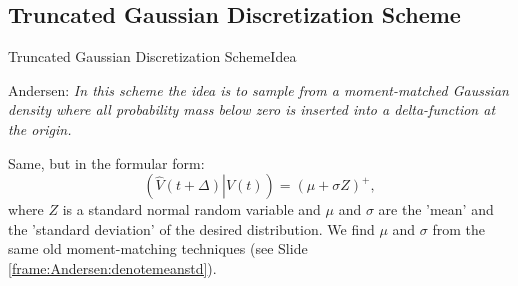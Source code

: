 \subsection{Truncated Gaussian Discretization Scheme}
    \begin{frame}{Truncated Gaussian Discretization Scheme}{Idea}
        \begin{block}{Andersen:}
            \emph{In this scheme the idea is to sample from a moment-matched Gaussian density where all probability
            mass below zero is inserted into a delta-function at the origin.}
        \end{block} 
        Same, but in the formular form:
        \begin{equation}
            \left(\left.\hat{V}(t+\Delta)\right| V(t)\right) = \left(\mu + \sigma Z\right)^+,
        \end{equation}
        where $Z$ is a standard normal random variable and $\mu$ and $\sigma$ are the 'mean' and the 'standard deviation' of the desired distribution.
        We find $\mu$ and $\sigma$ from the same old moment-matching techniques (see Slide \ref{frame:Andersen:denotemeanstd}).
    \end{frame}